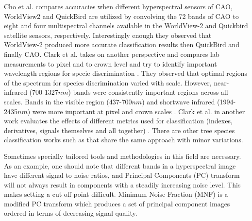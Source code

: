 \documentclass[remotesensing,article,accept,moreauthors,pdftex,12pt,a4paper]{mdpi}
\begin{document}
Cho et al. \cite{cho2012mapping} compares accuracies when different hyperspectral sensors of CAO, WorldView2 and QuickBird are utilized by convolving the 72 bands of CAO to eight and four multispectral channels available in the WorldView-2 and Quickbird satellite sensors, respectively. Interestingly enough they observed that WorldView-2 produced more accurate classification results then QuickBird and finally CAO. Clark et al. takes on another perspective and compares lab measurements to pixel and to crown level and try to identify important wavelength regions for specie discrimination \cite{clark2005hyperspectral}. They observed that optimal regions of the spectrum for species discrimination varied with scale. However, near-infrared (700-1327$nm$) bands were consistently important regions across all scales. Bands in the visible region (437-700$nm$) and shortwave infrared (1994-2435$nm$) were more important at pixel and crown scales  \cite{clark2005hyperspectral}. Clark et al. in another work evaluates the effects of different metrics used for classification (indexes, derivatives, signals themselves and all together) \cite{clark2012species}. There are other tree species classification works such as \cite{dalponte2014tree, feret2012semi, feret2013tree, ghosh2014framework, immitzer2012tree, naidoo2012classification, ustin2009retrieval} that share the same approach with minor variations. 

Sometimes specially tailored tools and methodologies in this field are necessary. As an example, one should note that different bands in a hyperspectral image have different signal to noise ratios, and Principal Components (PC) transform will not always result in components with a steadily increasing noise level. This makes setting a cut-off point difficult. Minimum Noise Fraction (MNF)   \cite{green1988transformation} is a modified PC transform which produces a set of principal component images ordered in terms of decreasing signal quality. 


\end{document}
